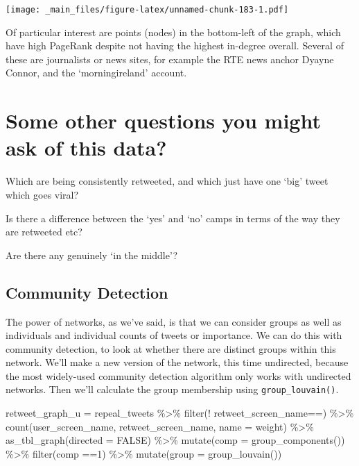 \documentclass[
]{book}
\newenvironment{Shaded}{\begin{snugshade}}{\end{snugshade}}
\newcommand{\AttributeTok}[1]{\textcolor[rgb]{0.77,0.63,0.00}{#1}}
\newcommand{\ConstantTok}[1]{\textcolor[rgb]{0.00,0.00,0.00}{#1}}
\newcommand{\DecValTok}[1]{\textcolor[rgb]{0.00,0.00,0.81}{#1}}
\newcommand{\FunctionTok}[1]{\textcolor[rgb]{0.00,0.00,0.00}{#1}}
\newcommand{\NormalTok}[1]{#1}
\newcommand{\OtherTok}[1]{\textcolor[rgb]{0.56,0.35,0.01}{#1}}
\newcommand{\SpecialCharTok}[1]{\textcolor[rgb]{0.00,0.00,0.00}{#1}}
\newcommand{\StringTok}[1]{\textcolor[rgb]{0.31,0.60,0.02}{#1}}
\begin{document}
\texttt{[image: \_main\_files/figure-latex/unnamed-chunk-183-1.pdf]}

Of particular interest are points (nodes) in the bottom-left of the graph, which have high PageRank despite not having the highest in-degree overall. Several of these are journalists or news sites, for example the RTE news anchor Dyayne Connor, and the `morningireland' account.

\hypertarget{some-other-questions-you-might-ask-of-this-data}{%
\section{Some other questions you might ask of this data?}\label{some-other-questions-you-might-ask-of-this-data}}

Which are being consistently retweeted, and which just have one `big' tweet which goes viral?

Is there a difference between the `yes' and `no' camps in terms of the way they are retweeted etc?

Are there any genuinely `in the middle'?

\hypertarget{community-detection}{%
\subsection{Community Detection}\label{community-detection}}

The power of networks, as we've said, is that we can consider groups as well as individuals and individual counts of tweets or importance. We can do this with community detection, to look at whether there are distinct groups within this network. We'll make a new version of the network, this time undirected, because the most widely-used community detection algorithm only works with undirected networks. Then we'll calculate the group membership using \texttt{group\_louvain()}.

\begin{Shaded}
\begin{Highlighting}[]
\NormalTok{retweet\_graph\_u }\OtherTok{=}\NormalTok{ repeal\_tweets }\SpecialCharTok{\%\textgreater{}\%} 
  \FunctionTok{filter}\NormalTok{(}\SpecialCharTok{!}\NormalTok{ retweet\_screen\_name}\SpecialCharTok{==}\StringTok{\textquotesingle{}\textquotesingle{}}\NormalTok{) }\SpecialCharTok{\%\textgreater{}\%} 
  \FunctionTok{count}\NormalTok{(user\_screen\_name, retweet\_screen\_name, }\AttributeTok{name =} \StringTok{\textquotesingle{}weight\textquotesingle{}}\NormalTok{) }\SpecialCharTok{\%\textgreater{}\%} 
  \FunctionTok{as\_tbl\_graph}\NormalTok{(}\AttributeTok{directed =} \ConstantTok{FALSE}\NormalTok{) }\SpecialCharTok{\%\textgreater{}\%} \FunctionTok{mutate}\NormalTok{(}\AttributeTok{comp =} \FunctionTok{group\_components}\NormalTok{()) }\SpecialCharTok{\%\textgreater{}\%} \FunctionTok{filter}\NormalTok{(comp }\SpecialCharTok{==}\DecValTok{1}\NormalTok{) }\SpecialCharTok{\%\textgreater{}\%} 
  \FunctionTok{mutate}\NormalTok{(}\AttributeTok{group =} \FunctionTok{group\_louvain}\NormalTok{()) }
\end{Highlighting}
\end{Shaded}
\end{document}

